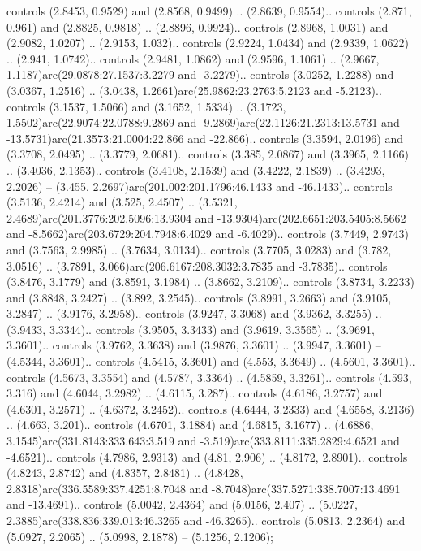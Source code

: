 controls (2.8453, 0.9529) and (2.8568, 0.9499) .. (2.8639, 0.9554).. controls (2.871, 0.961) and (2.8825, 0.9818) .. (2.8896, 0.9924).. controls (2.8968, 1.0031) and (2.9082, 1.0207) .. (2.9153, 1.032).. controls (2.9224, 1.0434) and (2.9339, 1.0622) .. (2.941, 1.0742).. controls (2.9481, 1.0862) and (2.9596, 1.1061) .. (2.9667, 1.1187)arc(29.0878:27.1537:3.2279 and -3.2279).. controls (3.0252, 1.2288) and (3.0367, 1.2516) .. (3.0438, 1.2661)arc(25.9862:23.2763:5.2123 and -5.2123).. controls (3.1537, 1.5066) and (3.1652, 1.5334) .. (3.1723, 1.5502)arc(22.9074:22.0788:9.2869 and -9.2869)arc(22.1126:21.2313:13.5731 and -13.5731)arc(21.3573:21.0004:22.866 and -22.866).. controls (3.3594, 2.0196) and (3.3708, 2.0495) .. (3.3779, 2.0681).. controls (3.385, 2.0867) and (3.3965, 2.1166) .. (3.4036, 2.1353).. controls (3.4108, 2.1539) and (3.4222, 2.1839) .. (3.4293, 2.2026) -- (3.455, 2.2697)arc(201.002:201.1796:46.1433 and -46.1433).. controls (3.5136, 2.4214) and (3.525, 2.4507) .. (3.5321, 2.4689)arc(201.3776:202.5096:13.9304 and -13.9304)arc(202.6651:203.5405:8.5662 and -8.5662)arc(203.6729:204.7948:6.4029 and -6.4029).. controls (3.7449, 2.9743) and (3.7563, 2.9985) .. (3.7634, 3.0134).. controls (3.7705, 3.0283) and (3.782, 3.0516) .. (3.7891, 3.066)arc(206.6167:208.3032:3.7835 and -3.7835).. controls (3.8476, 3.1779) and (3.8591, 3.1984) .. (3.8662, 3.2109).. controls (3.8734, 3.2233) and (3.8848, 3.2427) .. (3.892, 3.2545).. controls (3.8991, 3.2663) and (3.9105, 3.2847) .. (3.9176, 3.2958).. controls (3.9247, 3.3068) and (3.9362, 3.3255) .. (3.9433, 3.3344).. controls (3.9505, 3.3433) and (3.9619, 3.3565) .. (3.9691, 3.3601).. controls (3.9762, 3.3638) and (3.9876, 3.3601) .. (3.9947, 3.3601) -- (4.5344, 3.3601).. controls (4.5415, 3.3601) and (4.553, 3.3649) .. (4.5601, 3.3601).. controls (4.5673, 3.3554) and (4.5787, 3.3364) .. (4.5859, 3.3261).. controls (4.593, 3.316) and (4.6044, 3.2982) .. (4.6115, 3.287).. controls (4.6186, 3.2757) and (4.6301, 3.2571) .. (4.6372, 3.2452).. controls (4.6444, 3.2333) and (4.6558, 3.2136) .. (4.663, 3.201).. controls (4.6701, 3.1884) and (4.6815, 3.1677) .. (4.6886, 3.1545)arc(331.8143:333.643:3.519 and -3.519)arc(333.8111:335.2829:4.6521 and -4.6521).. controls (4.7986, 2.9313) and (4.81, 2.906) .. (4.8172, 2.8901).. controls (4.8243, 2.8742) and (4.8357, 2.8481) .. (4.8428, 2.8318)arc(336.5589:337.4251:8.7048 and -8.7048)arc(337.5271:338.7007:13.4691 and -13.4691).. controls (5.0042, 2.4364) and (5.0156, 2.407) .. (5.0227, 2.3885)arc(338.836:339.013:46.3265 and -46.3265).. controls (5.0813, 2.2364) and (5.0927, 2.2065) .. (5.0998, 2.1878) -- (5.1256, 2.1206);



